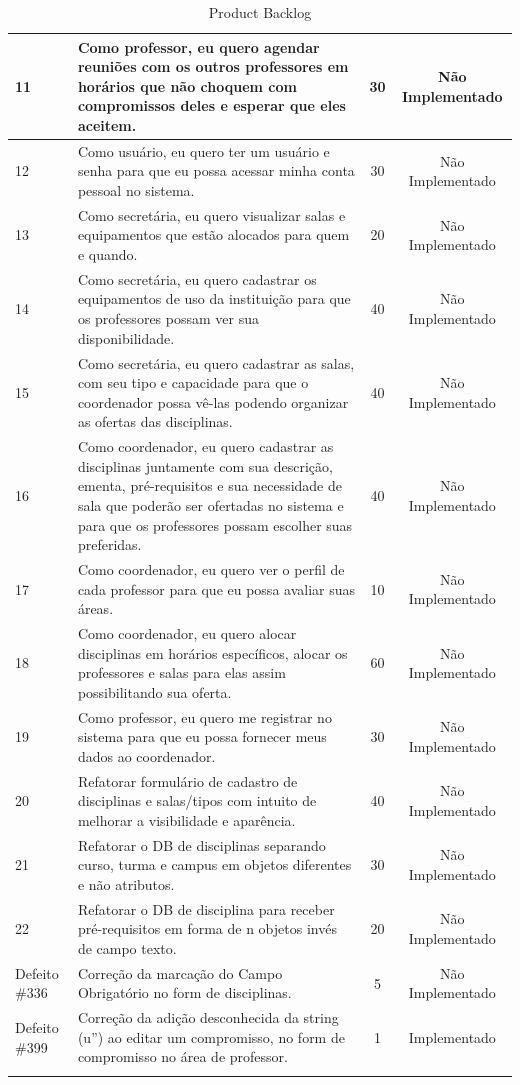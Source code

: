 \documentclass{abnt}
\begin{document}
\begin{landscape}
\begin{longtable}{|p{0.5in}|p{6in}|c|c|}
		        11 & Como professor, eu quero agendar reuniões com os outros professores em horários que não choquem com compromissos deles e esperar que eles aceitem.  &         30 & Não Implementado \\
		\hline
		        12 & Como usuário, eu quero ter um usuário e senha para que eu possa acessar minha conta pessoal no sistema. &         30 & Não Implementado \\
		\hline
		        13 & Como secretária, eu quero visualizar salas e equipamentos que estão alocados para quem e quando.  &         20 & Não Implementado \\
		\hline
		        14 & Como secretária, eu quero cadastrar os equipamentos de uso da instituição para que os professores possam ver sua disponibilidade.  &         40 & Não Implementado \\
		\hline
		        15 & Como secretária, eu quero cadastrar as salas, com seu tipo e capacidade para que o coordenador possa vê-las podendo organizar as ofertas das disciplinas. &         40 & Não Implementado \\
		\hline
		        16 & Como coordenador, eu quero cadastrar as disciplinas juntamente com sua descrição, ementa, pré-requisitos e sua necessidade de sala que poderão ser ofertadas no sistema e para que os professores possam escolher suas preferidas. &         40 & Não Implementado \\
		\hline
		        17 & Como coordenador, eu quero ver o perfil de cada professor para que eu possa avaliar suas áreas.  &         10 & Não Implementado \\
		\hline
		        18 & Como coordenador, eu quero alocar disciplinas em horários específicos, alocar os professores e salas para elas assim possibilitando sua oferta.  &         60 & Não Implementado \\
		\hline
		        19 & Como professor, eu quero me registrar no sistema para que eu possa fornecer meus dados ao coordenador. &         30 & Não Implementado \\
		\hline
		        20 & Refatorar formulário de cadastro de disciplinas e salas/tipos com intuito de melhorar a visibilidade e aparência.  &         40 & Não Implementado \\

		\hline
		        21 & Refatorar o DB de disciplinas separando curso, turma e campus em objetos diferentes e não atributos. &         30 & Não Implementado \\
		\hline
		        22 & Refatorar o DB de disciplina para receber pré-requisitos em forma de n objetos invés de campo texto. &         20 & Não Implementado \\
		\hline
		Defeito \#336 & Correção da marcação do Campo Obrigatório no form de disciplinas.  &          5 & Não Implementado \\
		\hline
		Defeito \#399  & Correção da adição desconhecida da string (u'') ao editar um compromisso, no form de compromisso no área de professor. &          1 & Implementado \\
		\hline
		\caption{Product Backlog}
		\end{longtable}
\end{landscape}
\end{document}
